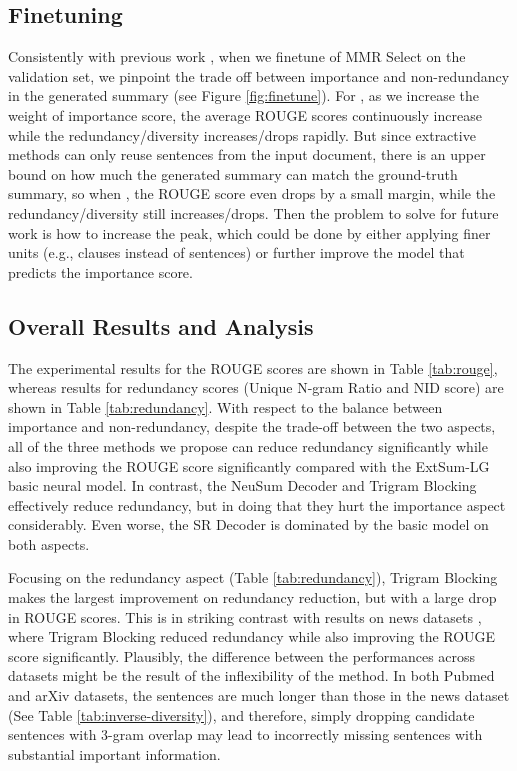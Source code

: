 \documentclass[11pt,a4paper]{article}
\begin{document}
\subsection{Finetuning }
\vspace{-1mm}
Consistently with previous work \cite{Jung2019}, when we finetune  of MMR Select on the validation set, we pinpoint the trade off between importance and non-redundancy in the generated summary (see Figure \ref{fig:finetune}). For , as we increase the weight of importance score, the average ROUGE scores continuously increase while the redundancy/diversity increases/drops rapidly. But since extractive methods can only reuse sentences from the input document, there is an upper bound on how much the generated summary can match the ground-truth summary, so when , the ROUGE score even drops by a small margin, while the redundancy/diversity still increases/drops.
Then the problem to solve for future work is how to increase the peak, which could be done by either applying finer units (e.g., clauses instead of sentences) or further improve the model that predicts the importance score.
\vspace{-1mm}
\subsection{Overall Results and Analysis}
\label{result_and_analysis}
\vspace{-1mm}
The experimental results for the ROUGE scores are shown in Table \ref{tab:rouge}, whereas results for redundancy scores (Unique N-gram Ratio and NID score) are shown in Table \ref{tab:redundancy}.
With respect to the balance between importance and non-redundancy, despite the trade-off between the two aspects, all of the three methods we propose can reduce redundancy significantly while also improving the ROUGE score significantly compared with the ExtSum-LG basic neural model. In contrast, the NeuSum Decoder and Trigram Blocking effectively reduce  redundancy, but in doing that they hurt the importance aspect considerably. Even worse, the SR Decoder is dominated by the basic model on both aspects.  



Focusing on the redundancy aspect (Table \ref{tab:redundancy}), Trigram Blocking makes the largest improvement on redundancy reduction, but with a large drop in ROUGE scores. This is in striking contrast with results on news datasets \cite{liu-lapata-2019-text}, where Trigram Blocking reduced redundancy while also improving the ROUGE score significantly. Plausibly,  the difference between the performances across datasets might be the result of the inflexibility of the method. In both Pubmed and arXiv datasets, the sentences are much longer than those in the news dataset (See Table \ref{tab:inverse-diversity}), and therefore, simply dropping candidate sentences with 3-gram overlap may lead to incorrectly missing sentences with substantial important information. 
\end{document}
